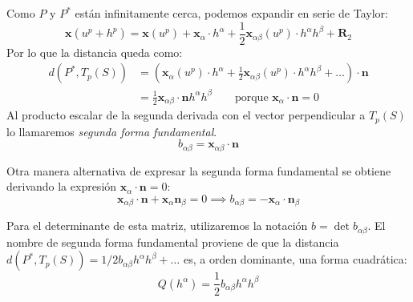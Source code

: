 Como $P$ y $P^*$ están infinitamente cerca, podemos expandir en serie de Taylor:
$$
\mathbf{x}(u^p+h^p)=\mathbf{x}(u^p)+\mathbf{x}_\alpha \cdot h^\alpha +\frac{1}{2}\mathbf{x}_{\alpha \beta }(u^p)\cdot h^\alpha h^\beta +\mathbf{R}_2
$$
Por lo que la distancia queda como:
\begin{equation*}
    \begin{split}
        d(P^*,T_p(S))&=\left ( \mathbf{x}_\alpha(u^p)\cdot h^\alpha +\frac{1}{2}\mathbf{x}_{\alpha \beta }(u^p)\cdot h^\alpha h^\beta +\ldots   \right )\cdot \mathbf{n}\\
        &=\frac{1}{2}\mathbf{x}_{\alpha \beta }\cdot \mathbf{n}h^\alpha h^\beta \qquad \text{porque }\mathbf{x}_\alpha \cdot \mathbf{n}=0
    \end{split}
\end{equation*}
Al producto escalar de la segunda derivada con el vector perpendicular a $T_p(S)$ lo llamaremos \emph{segunda forma fundamental}.
$$\boxed{b_{\alpha \beta }=\mathbf{x}_{\alpha \beta }\cdot \mathbf{n}}$$

Otra manera alternativa de expresar la segunda forma fundamental se obtiene derivando la expresión $\mathbf{x}_\alpha \cdot \mathbf{n}=0$:
$$
\mathbf{x}_{\alpha \beta }\cdot \mathbf{n}+\mathbf{x}_\alpha \mathbf{n}_\beta =0 \implies \boxed{b_{\alpha \beta }=-\mathbf{x}_\alpha \cdot \mathbf{n}_\beta }
$$

Para el determinante de esta matriz, utilizaremos la notación $b=\det{b_{\alpha \beta }}$. El nombre de segunda forma fundamental proviene de que la distancia $d(P^*,T_p(S))=1/2b_{\alpha \beta }h^\alpha h^\beta +\ldots $ es, a orden dominante, una forma cuadrática:
$$
Q(h^\alpha )=\frac{1}{2}b_{\alpha \beta }h^\alpha h^\beta 
$$


